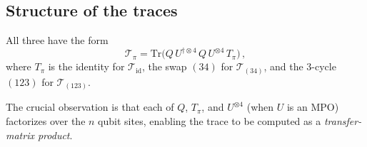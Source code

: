 \documentclass[11pt,a4paper]{article}
\theoremstyle{definition}
\theoremstyle{remark}
\renewcommand{\Tr}{\mathrm{Tr}}
\begin{document}
\subsection{Structure of the traces}

All three have the form
\begin{equation}\label{eq:trace_general}
  \mathcal{T}_\pi = \Tr\bigl(Q\,U^{\dagger\otimes 4}\,Q\,U^{\otimes 4}\,T_\pi\bigr)\,,
\end{equation}
where $T_\pi$ is the identity for $\mathcal{T}_{\mathrm{id}}$, the swap $(34)$ for $\mathcal{T}_{(34)}$, and the 3-cycle $(123)$ for $\mathcal{T}_{(123)}$.

The crucial observation is that each of $Q$, $T_\pi$, and $U^{\otimes 4}$ (when $U$ is an MPO) factorizes over the $n$ qubit sites, enabling the trace to be computed as a \emph{transfer-matrix product}.
\end{document}
